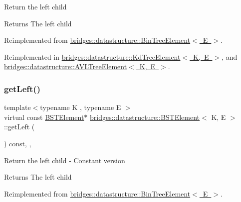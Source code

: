 Return the left child \begin{DoxyReturn}{Returns}
The left child 
\end{DoxyReturn}


Reimplemented from \mbox{\hyperlink{classbridges_1_1datastructure_1_1_bin_tree_element_ab30cfe373892c52709d5f1df013a0c82}{bridges\+::datastructure\+::\+Bin\+Tree\+Element$<$ E $>$}}.



Reimplemented in \mbox{\hyperlink{classbridges_1_1datastructure_1_1_kd_tree_element_a875bfa2dfd88a7740f7bcd28a117c12a}{bridges\+::datastructure\+::\+Kd\+Tree\+Element$<$ K, E $>$}}, and \mbox{\hyperlink{classbridges_1_1datastructure_1_1_a_v_l_tree_element_ab05925e343b9fa71b61c71e8034e1293}{bridges\+::datastructure\+::\+A\+V\+L\+Tree\+Element$<$ K, E $>$}}.

\mbox{\label{classbridges_1_1datastructure_1_1_b_s_t_element_abac324ef0b480420bd82ecfe4501d60d}} 
\subsubsection{\texorpdfstring{get\+Left()}{getLeft()}\hspace{0.1cm}{\footnotesize\ttfamily [2/2]}}
{\footnotesize\ttfamily template$<$typename K , typename E $>$ \\
virtual const \mbox{\hyperlink{classbridges_1_1datastructure_1_1_b_s_t_element}{B\+S\+T\+Element}}$\ast$ \mbox{\hyperlink{classbridges_1_1datastructure_1_1_b_s_t_element}{bridges\+::datastructure\+::\+B\+S\+T\+Element}}$<$ K, E $>$\+::get\+Left (\begin{DoxyParamCaption}{ }\end{DoxyParamCaption}) const\hspace{0.3cm}{\ttfamily [inline]}, {\ttfamily [override]}, {\ttfamily [virtual]}}

Return the left child -\/ Constant version

\begin{DoxyReturn}{Returns}
The left child 
\end{DoxyReturn}


Reimplemented from \mbox{\hyperlink{classbridges_1_1datastructure_1_1_bin_tree_element_ae14a70e2d25ad62337c87059b0cadb48}{bridges\+::datastructure\+::\+Bin\+Tree\+Element$<$ E $>$}}.



